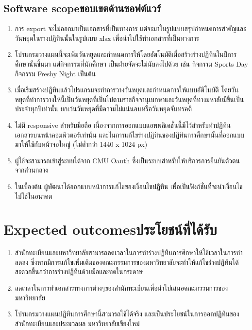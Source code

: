 \subsection{\ifenglish Software scope\else ขอบเขตด้านซอฟต์แวร์\fi}
\begin{enumerate}
    \item การ export จะไม่ออกมาเป็นเอกสารที่เป็นทางการ  แต่จะมาในรูปแบบสรุปกำหนดการสำคัญและวันหยุดในร่างปฏิทินนั้นในรูปแบบ xlsx เพื่อนำไปใช้ทำเอกสารที่เป็นทางการ
    \item โปรแกรมวางแผนนี้จะเพิ่มวันหยุดและกำหนดการให้โดยอัตโนมัติเมื่อสร้างร่างปฏิทินในปีการศึกษานั้นขึ้นมา แต่กิจกรรมที่นักศึกษา เป็นฝ่ายจัดจะไม่นับลงไปด้วย เช่น กิจกรรม Sports Day กิจกรรม Freshy Night เป็นต้น
    \item เมื่อเริ่มสร้างปฏิทินแล้วโปรแกรมจะทำการวางวันหยุดและกำหนดการให้แบบอัติโนมัติ โดยวันหยุดที่ทำการวางให้นี้เป็นวันหยุดที่เป็นไปตามราชกิจจานุเบกษาและวันหยุดที่ทางมหาลัยมีขึ้นเป็นประจำทุกปีเท่านั้น ยกเว้นวันหยุดที่มีความไม่แน่นอนหรือวันหยุดจันทรคติ
    \item ไม่มี responsive สำหรับมือถือ เนื่องจากการออกแบบแอพพลิเคชั่นนี้มีไว้สำหรับทำปฏิทินเอกสารบนหน้าคอมพิวตอร์เท่านั้น และในการแก้ไขร่างปฏิทินของปฏิทินการศึกษานั้นที่ออกแบบมาให้ใช้กับหน้าจอใหญ่ (ไม่ต่ำกว่า 1440 x 1024 px)
    \item ผู้ใช้จะสามารถเข้าสู่ระบบได้จาก CMU Oauth ซึ่งเป็นระบบสำหรับให้บริการการยืนยันตัวตนจากส่วนกลาง
    \item ในเบื้องต้น ผู้พัฒนาได้ออกแบบหน้าการแก้ไขของเงื่อนไขปฏิทิน เพื่อเป็นฟังก์ชั่นที่จะนำเงื่อนไขไปใช้ในอนาคต
\end{enumerate}

\section{\ifenglish Expected outcomes\else ประโยชน์ที่ได้รับ\fi}
\begin{enumerate}
    \item สำนักทะเบียนและมหาวิทยาลัยสามารถลดเวลาในการทำร่างปฏิทินการศึกษาให้ใช้เวลาในการทําลดลง ซึ่งหากมีการแก้ไขเพิ่มเติมของคณะกรรมการของมหาวิทยาลัยจะทำให้แก้ไขร่างปฏิทินได้สะดวกขึ้นกว่าการร่างปฏิทินด้วยมือและทดในกระดาษ
    \item ลดเวลาในการทำเอกสารทางการต่างๆของสำนักทะเบียนเพื่อนำไปเสนอคณะกรรมการของมหาวิทยาลัย
    \item โปรแกรมวางแผนปฏิทินการศึกษานี้สามารถใช้ได้จริง และเป็นประโยชน์ในการออกปฏิทินของสำนักทะเบียนและประมวลผล มหาวิทยาลัยเชียงใหม่
\end{enumerate}


